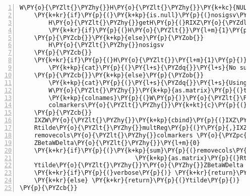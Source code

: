 \begin{Verbatim}[commandchars=\\\{\},codes={\catcode`\$=3\catcode`\^=7\catcode`\_=8},gobble=0,numbers=left,fontfamily=fvm,fontshape=n,fontsize=\footnotesize,tabsize=2]
	W\PY{o}{\PYZlt{}\PYZhy{}}H\PY{o}{\PYZlt{}\PYZhy{}}\PY{k+kc}{NULL}
	\PY{k+kr}{if}\PY{p}{(}\PY{k+kp}{is.null}\PY{p}{(}nosigsv\PY{p}{)}\PY{p}{)}\PY{p}{\PYZob{}}
		H\PY{o}{\PYZlt{}\PYZhy{}}getH\PY{p}{(}RIXZ\PY{o}{\PYZdl{}}RES\PY{p}{,}IXZ\PY{p}{,}nullsig\PY{o}{=}\PY{l+m}{0.1}\PY{p}{,}verbose\PY{o}{=}\PY{k+kc}{FALSE}\PY{p}{)}
		\PY{k+kr}{if}\PY{p}{(}H\PY{o}{\PYZlt{}}\PY{l+m}{1}\PY{p}{)} \PY{k+kp}{cat}\PY{p}{(}\PY{l+s}{\PYZdq{}}\PY{l+s}{No significant surrogate variables found \PYZbs{}n\PYZdq{}}\PY{p}{)}
	\PY{p}{\PYZcb{}}\PY{k+kp}{else}\PY{p}{\PYZob{}}
		H\PY{o}{\PYZlt{}\PYZhy{}}nosigsv
	\PY{p}{\PYZcb{}}
	\PY{k+kr}{if}\PY{p}{(}H\PY{o}{\PYZlt{}}\PY{l+m}{1}\PY{p}{)}\PY{p}{\PYZob{}}
		\PY{k+kp}{cat}\PY{p}{(}\PY{l+s}{\PYZdq{}}\PY{l+s}{No surrogate variables will be used \PYZbs{}n\PYZdq{}}\PY{p}{)}
	\PY{p}{\PYZcb{}}\PY{k+kp}{else}\PY{p}{\PYZob{}}
		\PY{k+kp}{cat}\PY{p}{(}\PY{l+s}{\PYZdq{}}\PY{l+s}{Using H=\PYZdq{}}\PY{p}{,}H\PY{p}{,}\PY{l+s}{\PYZdq{}}\PY{l+s}{ significant surrogate variables \PYZbs{}n\PYZdq{}}\PY{p}{,}sep\PY{o}{=}\PY{l+s}{\PYZdq{}}\PY{l+s}{\PYZdq{}}\PY{p}{)}
		W\PY{o}{\PYZlt{}\PYZhy{}}\PY{k+kp}{as.matrix}\PY{p}{(}thissvd\PY{o}{\PYZdl{}}u\PY{p}{[}\PY{p}{,}\PY{l+m}{1}\PY{o}{:}H\PY{p}{]}\PY{p}{)} 
		\PY{k+kp}{colnames}\PY{p}{(}W\PY{p}{)}\PY{o}{\PYZlt{}\PYZhy{}}\PY{k+kp}{paste}\PY{p}{(}\PY{l+s}{\PYZdq{}}\PY{l+s}{W\PYZdq{}}\PY{p}{,}\PY{l+m}{1}\PY{o}{:}H\PY{p}{,}sep\PY{o}{=}\PY{l+s}{\PYZdq{}}\PY{l+s}{\PYZdq{}}\PY{p}{)}
		colmarkers\PY{o}{\PYZlt{}\PYZhy{}}\PY{k+kt}{c}\PY{p}{(}colmarkers\PY{p}{,}\PY{k+kp}{rep}\PY{p}{(}\PY{l+s}{\PYZdq{}}\PY{l+s}{W\PYZdq{}}\PY{p}{,}H\PY{p}{)}\PY{p}{)}
	\PY{p}{\PYZcb{}}
	IXZW\PY{o}{\PYZlt{}\PYZhy{}}\PY{k+kp}{cbind}\PY{p}{(}IXZ\PY{p}{,}W\PY{p}{)}
	Rtilde\PY{o}{\PYZlt{}\PYZhy{}}multReg\PY{p}{(}Y\PY{p}{,}IXZW\PY{p}{)}
	removecols\PY{o}{\PYZlt{}\PYZhy{}}colmarkers \PY{o}{\PYZpc{}in\PYZpc{}} \PY{k+kt}{c}\PY{p}{(}\PY{l+s}{\PYZdq{}}\PY{l+s}{Z\PYZdq{}}\PY{p}{,}\PY{l+s}{\PYZdq{}}\PY{l+s}{W\PYZdq{}}\PY{p}{)}
	ZBetaWDelta\PY{o}{\PYZlt{}\PYZhy{}}\PY{l+m}{0}
	\PY{k+kr}{if}\PY{p}{(}\PY{k+kp}{sum}\PY{p}{(}removecols\PY{p}{)}\PY{p}{)} ZBetaWDelta\PY{o}{\PYZlt{}\PYZhy{}}\PY{k+kp}{as.matrix}\PY{p}{(}IXZW\PY{p}{[}\PY{p}{,}removecols\PY{p}{]}\PY{p}{)} \PY{o}{\PYZpc{}*\PYZpc{}} 
								\PY{k+kp}{as.matrix}\PY{p}{(}Rtilde\PY{o}{\PYZdl{}}BETA\PY{p}{[}removecols\PY{p}{,}\PY{p}{]}\PY{p}{)}
	Ytilde\PY{o}{\PYZlt{}\PYZhy{}}Y\PY{o}{\PYZhy{}}ZBetaWDelta
	\PY{k+kr}{if}\PY{p}{(}verbose\PY{p}{)} \PY{k+kr}{return}\PY{p}{(}\PY{k+kt}{list}\PY{p}{(}Ytilde\PY{o}{=}Ytilde\PY{p}{,}paramlabels\PY{o}{=}colmarkers\PY{p}{,}W\PY{o}{=}W\PY{p}{,}H\PY{o}{=}H\PY{p}{)}\PY{p}{)} 
	\PY{k+kr}{else} \PY{k+kr}{return}\PY{p}{(}Ytilde\PY{p}{)}
\PY{p}{\PYZcb{}}
\end{Verbatim}
